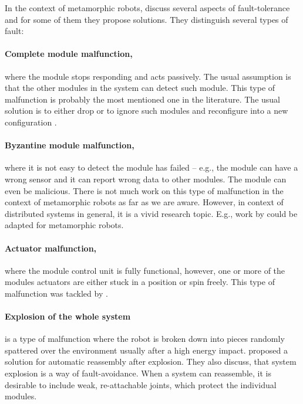 In the context of metamorphic robots, \textcite{DKbotDistr} discuss several
aspects of fault-tolerance and for some of them they propose solutions. They
distinguish several types of fault:

\paragraph{Complete module malfunction,} where the module stops responding and
acts passively. The usual assumption is that the other modules in the system can
detect such module. This type of malfunction is probably the most mentioned one
in the literature. The usual solution is to either drop or to ignore such
modules and reconfigure into a new configuration
\cite{DBLP:conf/ieeealife/Christensen07, DMotionCoord}.

\paragraph{Byzantine module malfunction,} where it is not easy to detect the
module has failed -- e.g., the module can have a wrong sensor and it can report
wrong data to other modules. The module can even be malicious. There is not much
work on this type of malfunction in the context of metamorphic robots as far as
we are aware. However, in context of distributed systems in general, it is a
vivid research topic. E.g., work by \textcite{DBLP:conf/osdi/CastroL99} could be
adapted for metamorphic robots.

\paragraph{Actuator malfunction,} where the module control unit is fully
functional, however, one or more of the modules actuators are either stuck
in a position or spin freely. This type of malfunction was tackled by
\textcite{DBLP:conf/romoco/VonasekONW15}.

\paragraph{Explosion of the whole system} is a type of malfunction where the
robot is broken down into pieces randomly spattered over the environment usually
after a high energy impact. \textcite{DBLP:conf/iros/YimSSPDT07a} proposed a
solution for automatic reassembly after explosion. They also discuss, that
system explosion is a way of fault-avoidance. When a system can reassemble, it
is desirable to include weak, re-attachable joints, which protect the individual
modules.

